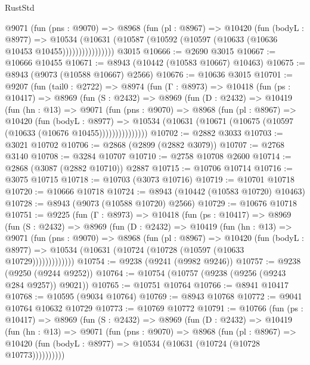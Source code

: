 \begin{lexlean}{RustStd}
\begin{coremodule}
                @9071
                  (fun (pns : @9070) =>
                  @8968
                    (fun (pl : @8967) =>
                    @10420
                      (fun (bodyL : @8977) =>
                      @10534
                        (@10631
                          (@10587 (@10592 (@10597 (@10633 (@10636 @10453 @10455))))))))))))))))
    @3015
@10666 := @2690 @3015
@10667 := @10666 @10455
@10671 := @8943 (@10442 (@10583 @10667) @10463)
@10675 := @8943 (@9073 (@10588 @10667) @2566)
@10676 := @10636 @3015
@10701 := @9207
    (fun (tail0 : @2722) =>
    @8974
      (fun (Γ : @8973) =>
      @10418
        (fun (ps : @10417) =>
        @8969
          (fun (S : @2432) =>
          @8969
            (fun (D : @2432) =>
            @10419
              (fun (hn : @13) =>
              @9071
                (fun (pns : @9070) =>
                @8968
                  (fun (pl : @8967) =>
                  @10420
                    (fun (bodyL : @8977) =>
                    @10534 (@10631 (@10671 (@10675 (@10597 (@10633 (@10676 @10455)))))))))))))))
@10702 := @2882 @3033
@10703 := @3021 @10702
@10706 := @2868 (@2899 (@2882 @3079))
@10707 := @2768 @3140
@10708 := @3284 @10707
@10710 := @2758 @10708 @2600
@10714 := @2868 (@3087 (@2882 @10710)) @2887
@10715 := @10706 @10714
@10716 := @3075 @10715
@10718 := @10703 (@3073 @10716)
@10719 := @10701 @10718
@10720 := @10666 @10718
@10724 := @8943 (@10442 (@10583 @10720) @10463)
@10728 := @8943 (@9073 (@10588 @10720) @2566)
@10729 := @10676 @10718
@10751 := @9225
    (fun (Γ : @8973) =>
    @10418
      (fun (ps : @10417) =>
      @8969
        (fun (S : @2432) =>
        @8969
          (fun (D : @2432) =>
          @10419
            (fun (hn : @13) =>
            @9071
              (fun (pns : @9070) =>
              @8968
                (fun (pl : @8967) =>
                @10420
                  (fun (bodyL : @8977) =>
                  @10534 (@10631 (@10724 (@10728 (@10597 (@10633 @10729)))))))))))))
@10754 := @9238 (@9241 (@9982 @9246))
@10757 := @9238 (@9250 (@9244 @9252))
@10764 := @10754 (@10757 (@9238 (@9256 (@9243 @284 @9257)) @9021))
@10765 := @10751 @10764
@10766 := @8941 @10417
@10768 := @10595 (@9034 @10764)
@10769 := @8943 @10768
@10772 := @9041 @10764 @10632 @10729
@10773 := @10769 @10772
@10791 := @10766
    (fun (ps : @10417) =>
    @8969
      (fun (S : @2432) =>
      @8969
        (fun (D : @2432) =>
        @10419
          (fun (hn : @13) =>
          @9071
            (fun (pns : @9070) =>
            @8968
              (fun (pl : @8967) =>
              @10420 (fun (bodyL : @8977) => @10534 (@10631 (@10724 (@10728 @10773))))))))))

\end{coremodule}
\end{lexlean}
